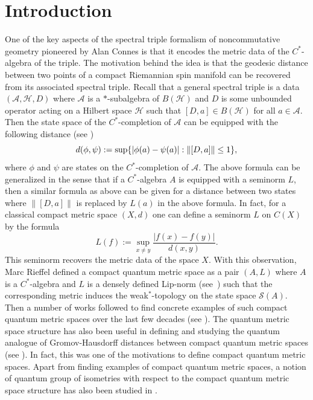 \documentclass[a4paper,11pt,reqno]{amsart}
\theoremstyle{plain}
\theoremstyle{named}
\numberwithin{equation}{section}
\newcommand{\hnorm}[1]{\left\lVert#1\right\rVert}
\begin{document}
			\section{Introduction}
			One of the key aspects of the spectral triple formalism of noncommutative geometry pioneered by Alan Connes is that it encodes the metric data of the $C^{\ast}$-algebra of the triple. The motivation behind the idea is that the geodesic distance between two points of a compact Riemannian spin manifold can be recovered from its associated spectral triple. Recall that a general spectral triple is a data $(\mathcal{A},\mathcal{H}, D)$ where $\mathcal A$ is a $\ast$-subalgebra of $B(\mathcal H)$ and $D$ is some unbounded operator acting on a Hilbert space $\mathcal H$ such that $[D,a]\in B(\mathcal{H})$ for all $a\in\mathcal{A}$. Then the state space of the $C^{\ast}$-completion of $\mathcal{A}$ can be equipped with the following distance (see \cite{Connes-1989-Compact-metric-sp-Fred-mod-Hyperfinteness}) 
			\begin{displaymath}
				d(\phi,\psi):={\rm sup} \{|\phi(a)-\psi(a)| : \hnorm{[D,a]}\leq 1\},
			\end{displaymath}
			where $\phi$ and $\psi$ are states on the $C^{\ast}$-completion of $\mathcal A.$ The above formula can be generalized in the sense that if a $C^{\ast}$-algebra $A$ is equipped with a seminorm $L$, then a similar formula as above can be given for a distance between two states where $\hnorm{[D,a]}$ is replaced by $L(a)$ in the above formula. In fact, for a classical compact metric space $(X,d)$ one can define a seminorm $L$ on $C(X)$ by the formula 
			\begin{displaymath}
				L (f):={\sup\limits}_{x\neq y}\frac{|f(x)-f(y)|}{d(x,y)}.  
			\end{displaymath}
			This seminorm recovers the metric data of the space $X$.
			With this observation, Marc Rieffel defined a compact quantum metric space as a pair $(A,L)$ where \(A\) is a \(C^*\)-algebra and $L$ is a densely defined Lip-norm (see~\cite[Definition 2.2]{Article}) such that the corresponding metric induces the weak$^\ast$-topology on the state space $\mathcal{S}(A)$. Then a number of works followed to find concrete examples of such compact quantum metric spaces over the last few decades (see \cite{Ozawa_Rieffel_2005, Rieffel-2002-Group-C-alg-as-compact-quan-metr-sp, Connes-1989-Compact-metric-sp-Fred-mod-Hyperfinteness, Rieffel-1999-Metrics-on-state-spaces, Long-Wu-2017-Twisted-group-C-alg-as-CQMS, Rieffel-1998-Metrics-on-state-from-action-of-cmpt-gp, Article, DKJK, Latrmolire2018TheGP, FL, Quaegebeur2010IsometricCO}). The quantum metric space structure has also been useful in defining and studying the quantum analogue of Gromov-Hausdorff distances between compact quantum metric spaces (see \cite{Latrmolire2018TheGP, Article}). In fact, this was one of the motivations to define compact quantum metric spaces.  Apart from finding examples of compact quantum metric spaces, a notion of quantum group of isometries with respect to the compact quantum metric space structure has also been studied in \cite{Quaegebeur2010IsometricCO}.\\
\end{document}
